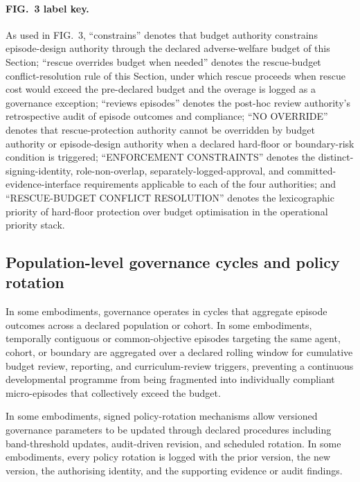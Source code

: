 \documentclass[a4paper,12pt]{article}
\begin{document}
\paragraph{FIG.~3 label key.}
As used in FIG.~3, ``constrains'' denotes that budget authority
constrains episode-design authority through the declared
adverse-welfare budget of this Section;
``rescue overrides budget when needed'' denotes the rescue-budget
conflict-resolution rule of this Section, under which rescue
proceeds when rescue cost would exceed the pre-declared budget and
the overage is logged as a governance exception;
``reviews episodes'' denotes the post-hoc review authority's
retrospective audit of episode outcomes and compliance;
``NO OVERRIDE'' denotes that rescue-protection authority cannot be
overridden by budget authority or episode-design authority when a
declared hard-floor or boundary-risk condition is triggered;
``ENFORCEMENT CONSTRAINTS'' denotes the distinct-signing-identity,
role-non-overlap, separately-logged-approval, and
committed-evidence-interface requirements applicable to each of the
four authorities; and ``RESCUE-BUDGET CONFLICT RESOLUTION'' denotes
the lexicographic priority of hard-floor protection over budget
optimisation in the operational priority stack.

\subsection{Population-level governance cycles and policy rotation}
\label{sec:policy-rotation}

In some embodiments, governance operates in cycles that aggregate
episode outcomes across a declared population or cohort. In some
embodiments, temporally contiguous or common-objective episodes
targeting the same agent, cohort, or boundary are aggregated over a
declared rolling window for cumulative budget review, reporting, and
curriculum-review triggers, preventing a continuous developmental
programme from being fragmented into individually compliant
micro-episodes that collectively exceed the budget.

In some embodiments, signed policy-rotation mechanisms allow versioned
governance parameters to be updated through declared procedures
including band-threshold updates, audit-driven revision, and scheduled
rotation. In some embodiments, every policy rotation is logged with
the prior version, the new version, the authorising identity, and the
supporting evidence or audit findings.
\end{document}
